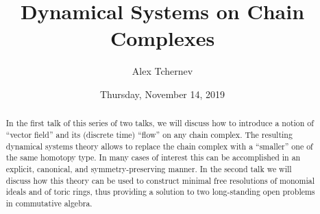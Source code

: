 \documentclass{UAmathtalk}
\author{Alex Tchernev}
\title{Dynamical Systems on Chain Complexes}
\date{Thursday, November 14, 2019}
\begin{document}
\maketitle

\begin{abstract}
In the first talk of this series of two talks, we will discuss how to introduce
a notion of ``vector field'' and its (discrete time) ``flow'' on any chain complex.
The resulting dynamical systems theory allows to replace the chain complex
with a ``smaller'' one of the same homotopy type. In many cases of interest
this can be accomplished in an explicit, canonical, and symmetry-preserving
manner. In the second talk we will discuss how this theory can be used
to construct minimal free resolutions of monomial ideals and of toric rings, thus
providing a solution to two long-standing open problems in commutative
algebra.
\end{abstract}
\end{document}
